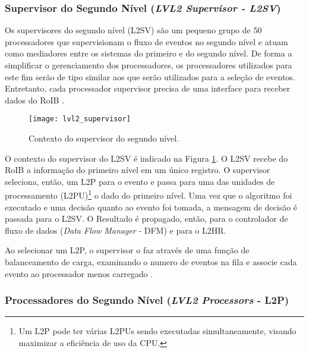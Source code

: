 \subsubsection{Supervisor do Segundo Nível (\emph{LVL2 Supervisor - L2SV})}
\label{sec:l2sv}

Os supervisores do segundo nível (L2SV) são um pequeno grupo de 50 processadores que supervisionam o fluxo de eventos no segundo nível e atuam como mediadores entre os sistemas do primeiro e do segundo nível. De forma a simplificar o gerenciamento dos processadores, os processadores utilizados para este fim serão de tipo similar aos que serão utilizados para a seleção de eventos. Entretanto, cada processador supervisor precisa de uma interface para receber dados do RoIB \cite{bib:tdaq_tdr}.

\begin{figure}
\begin{center}
\texttt{[image: lvl2\_supervisor]}
\caption{Contexto do supervisor do segundo nível.}
\label{fig:l2sv}
\end{center}
\end{figure}

O contexto do supervisor do L2SV é indicado na Figura \ref{fig:l2sv}. O L2SV recebe do RoIB a informação do primeiro nível em um único registro. O supervisor seleciona, então, um L2P para o evento e passa para uma das unidades de processamento (L2PU)\footnote{Um L2P pode ter várias L2PUs sendo executadas simultaneamente, visando maximizar a eficiência de uso da CPU.} o dado do primeiro nível. Uma vez que o algoritmo foi executado e uma decisão quanto ao evento foi tomada, a mensagem de decisão é passada para o L2SV. O Resultado é propagado, então, para o controlador de fluxo de dados (\emph{Data Flow Manager} - DFM) e para o L2HR. 

Ao selecionar um L2P, o supervisor o faz através de uma função de balanceamento de carga, examinando o numero de eventos na fila e associe cada evento ao processador menos carregado \cite{bib:tdaq_tdr}.


\subsubsection{Processadores do Segundo Nível (\emph{LVL2 Processors} - L2P)}
\label{sec:l2p}

